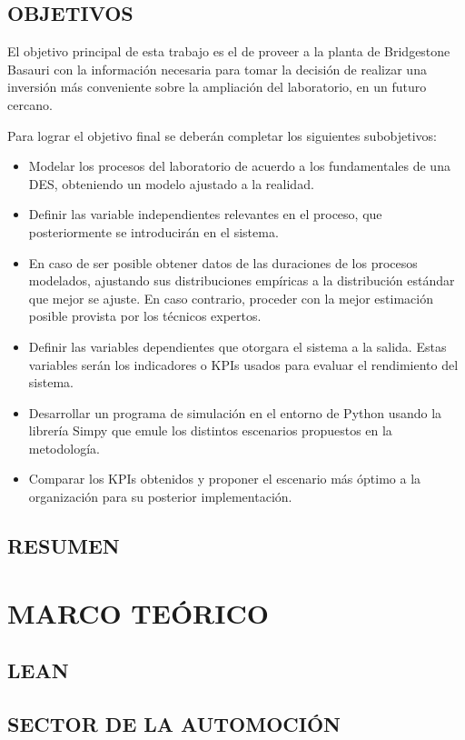 \documentclass[12pt]{article}
\begin{document}
\subsection{OBJETIVOS}

El objetivo principal de esta trabajo es el de proveer a la planta de Bridgestone Basauri con la información necesaria para tomar la decisión de realizar una inversión más conveniente sobre la ampliación del laboratorio, en un futuro cercano.

Para lograr el objetivo final se deberán completar los siguientes subobjetivos:

\begin{itemize}
  \item Modelar los procesos del laboratorio de acuerdo a los fundamentales de una DES, obteniendo un modelo ajustado a la realidad.
  \item Definir las variable independientes relevantes en el proceso, que posteriormente se introducirán en el sistema.
  \item En caso de ser posible obtener datos de las duraciones de los procesos modelados, ajustando sus distribuciones empíricas a la distribución estándar que mejor se ajuste. En caso contrario, proceder con la mejor estimación posible provista por los técnicos expertos.
  \item Definir las variables dependientes que otorgara el sistema a la salida. Estas variables serán los indicadores o KPIs usados para evaluar el rendimiento del sistema.
  \item Desarrollar un programa de simulación en el entorno de Python usando la librería Simpy que emule los distintos escenarios propuestos en la metodología.
  \item Comparar los KPIs obtenidos y proponer el escenario más óptimo a la organización para su posterior implementación.
\end{itemize}

\subsection{RESUMEN}

\section{MARCO TEÓRICO}
\subsection{LEAN}
\subsection{SECTOR DE LA AUTOMOCIÓN}
\end{document}
